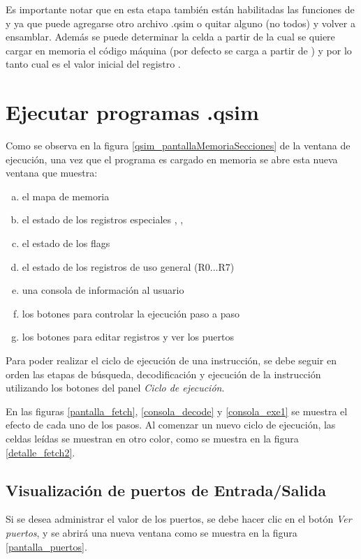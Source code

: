 Es importante notar que en esta etapa también están habilitadas las funciones de \textbf{\funAgregar} y \textbf{\funEnsamblar} ya que puede  agregarse otro archivo .qsim o quitar alguno (no todos) y volver a ensamblar. Además se puede determinar la celda a partir de la cual se quiere cargar en memoria el código máquina (por defecto se carga a partir de ) y por lo tanto cual es el valor inicial del registro .

\newpage
\section{Ejecutar programas .qsim}
Como se observa en la figura \ref{qsim_pantallaMemoriaSecciones} de la ventana de ejecución, una vez que el programa es cargado en memoria se abre esta nueva ventana que muestra:
\begin{enumerate}[(a)]
\item el mapa de memoria
\item el estado de los registros especiales \PC, \IR, \SP
\item el estado de los flags
\item el estado de los registros de uso general (R0...R7)
\item una consola de información al usuario
\item los botones para controlar la ejecución paso a paso
\item los botones para editar registros y ver los puertos
\end{enumerate}

Para poder realizar el ciclo de ejecución de una instrucción, se debe seguir en orden las etapas de búsqueda, decodificación y ejecución de la instrucción utilizando los botones del panel \textit{Ciclo de ejecución}.


En las figuras \ref{pantalla_fetch}, \ref{consola_decode} y \ref{consola_exe1} se muestra el efecto de cada uno de los pasos. Al comenzar un nuevo ciclo de ejecución, las celdas leídas se muestran en otro color, como se muestra en la figura \ref{detalle_fetch2}.



\subsection{Visualización de puertos de Entrada/Salida}

Si se desea administrar el valor de los puertos, se debe hacer clic en el botón \textit{Ver puertos}, y se abrirá una nueva ventana como se muestra en la figura \ref{pantalla_puertos}. 
\\

